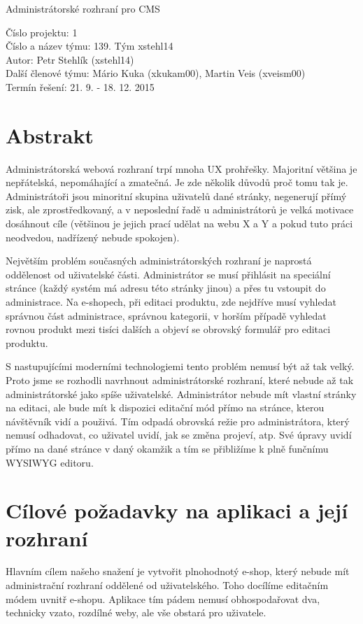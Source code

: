 \documentclass[11pt,a4paper]{article}
\begin{document}
\begin{center}
\LARGE{Administrátorské rozhraní pro CMS}
\end{center}
Číslo projektu: 1\\
Číslo a název týmu: 139. Tým xstehl14\\
Autor: Petr Stehlík (xstehl14) \\
Další členové týmu: Mário Kuka (xkukam00), Martin Veis (xveism00)\\
Termín řešení: 21. 9. - 18. 12. 2015\\


\section*{Abstrakt}
Administrátorská webová rozhraní trpí mnoha UX prohřešky. Majoritní většina je nepřátelská, nepomáhající a zmatečná. Je zde několik důvodů proč tomu tak je. Administrátoři jsou minoritní skupina uživatelů dané stránky, negenerují přímý zisk, ale zprostředkovaný, a v neposlední řadě u administrátorů je velká motivace dosáhnout cíle (většinou je jejich prací udělat na webu X a Y a pokud tuto práci neodvedou, nadřízený nebude spokojen).

Největším problém současných administrátorských rozhraní je naprostá oddělenost od uživatelské části. Administrátor se musí přihlásit na speciální stránce (každý systém má adresu této stránky jinou) a přes tu vstoupit do administrace. Na e-shopech, při editaci produktu, zde nejdříve musí vyhledat správnou část administrace, správnou kategorii, v horším případě vyhledat rovnou produkt mezi tisíci dalších a objeví se obrovský formulář pro editaci produktu.

S nastupujícími moderními technologiemi tento problém nemusí být až tak velký. Proto jsme se rozhodli navrhnout administrátorské rozhraní, které nebude až tak administrátorské jako spíše uživatelské. Administrátor nebude mít vlastní stránky na editaci, ale bude mít k dispozici editační mód přímo na stránce, kterou návštěvník vidí a použivá. Tím odpadá obrovská režie pro administrátora, který nemusí odhadovat, co uživatel uvidí, jak se změna projeví, atp. Své úpravy uvidí přímo na dané stránce v daný okamžik a tím se přibližíme k plně funčnímu WYSIWYG editoru.

\section*{Cílové požadavky na aplikaci a její rozhraní}
Hlavním cílem našeho snažení je vytvořit plnohodnotý e-shop, který nebude mít administrační rozhraní oddělené od uživatelského. Toho docílíme editačním módem uvnitř e-shopu. Aplikace tím pádem nemusí obhospodařovat dva, technicky vzato, rozdílné weby, ale vše obstará  pro uživatele.
\end{document}
